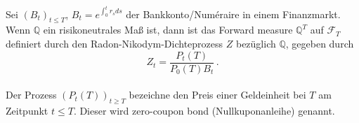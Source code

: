 \documentclass{article}
\begin{document}
\paragraph{}

\paragraph{}
Sei $(B_t)_{t\leq T}$, $B_t=e^{\int_0^tr_sds}$ der Bankkonto/Numéraire in einem Finanzmarkt.
Wenn $\mathbb{Q}$ ein risikoneutrales Maß ist, dann ist das Forward measure $\mathbb{Q}^T$ auf $\mathscr{F}_T$ definiert durch den Radon-Nikodym-Dichteprozess $Z$ bezüglich $\mathbb{Q}$, gegeben durch
\[
  Z_t=\frac{P_t(T)}{P_0(T)B_t}\,.
\]
\paragraph{}
Der Prozess $(P_t(T))_{t\geq T}$ bezeichne den Preis einer Geldeinheit bei $T$ am Zeitpunkt $t\leq T$.
Dieser wird zero-coupon bond (Nullkuponanleihe) genannt.


\end{document}
